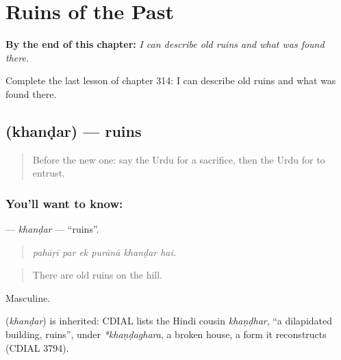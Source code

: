 
\chapter{Ruins of the Past}
\label{ch:ur-ruins-of-the-past}

\begin{chapteropening}
\textbf{By the end of this chapter:} \emph{I can describe old ruins and what was found there.}

Complete the last lesson of chapter 314: I can describe old ruins and what was found there.
\end{chapteropening}

\section[\texorpdfstring{\ur{کھنڈر} (khanḍar)}{کھنڈر (khanḍar)}]{ (khanḍar) — ruins}

\label{lesson:UR-C314-khandar}



\begin{quote}
Before the new one: say the Urdu for a sacrifice, then the Urdu for to entrust.
\end{quote}

\subsection*{You'll want to know: }
\textbf{} — \emph{khanḍar} — \textquotedblleft{}ruins\textquotedblright{}.

\begin{quote}
     
\end{quote}

\begin{quote}
\emph{pahāṛī par ek purānā khanḍar hai.}
\end{quote}

\begin{quote}
There are old ruins on the hill.
\end{quote}

Masculine.

\begin{cousinweb}
\textbf{} (\emph{khanḍar}) is inherited: CDIAL lists the Hindi cousin \emph{khaṇḍhar}, \textquotedblleft{}a dilapidated building, ruins\textquotedblright{}, under \emph{*khaṇḍaghara}, a broken house, a form it reconstructs (CDIAL 3794).
\end{cousinweb}

